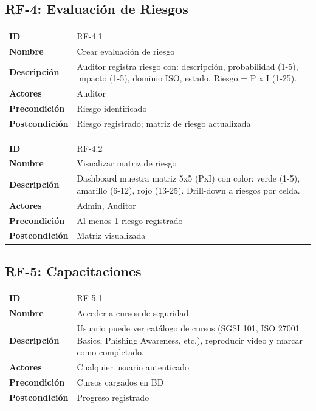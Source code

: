 \documentclass[12pt,a4paper,oneside]{article}
\begin{document}
\subsection{RF-4: Evaluación de Riesgos}

\begin{tabularx}{\linewidth}{|l|X|}
\hline
\textbf{ID} & RF-4.1 \\
\textbf{Nombre} & Crear evaluación de riesgo \\
\textbf{Descripción} & Auditor registra riesgo con: descripción, probabilidad (1-5), impacto (1-5), dominio ISO, estado. Riesgo = P x I (1-25). \\
\textbf{Actores} & Auditor \\
\textbf{Precondición} & Riesgo identificado \\
\textbf{Postcondición} & Riesgo registrado; matriz de riesgo actualizada \\
\hline
\end{tabularx}

\begin{tabularx}{\linewidth}{|l|X|}
\hline
\textbf{ID} & RF-4.2 \\
\textbf{Nombre} & Visualizar matriz de riesgo \\
\textbf{Descripción} & Dashboard muestra matriz 5x5 (PxI) con color: verde (1-5), amarillo (6-12), rojo (13-25). Drill-down a riesgos por celda. \\
\textbf{Actores} & Admin, Auditor \\
\textbf{Precondición} & Al menos 1 riesgo registrado \\
\textbf{Postcondición} & Matriz visualizada \\
\hline
\end{tabularx}

\subsection{RF-5: Capacitaciones}

\begin{tabularx}{\linewidth}{|l|X|}
\hline
\textbf{ID} & RF-5.1 \\
\textbf{Nombre} & Acceder a cursos de seguridad \\
\textbf{Descripción} & Usuario puede ver catálogo de cursos (SGSI 101, ISO 27001 Basics, Phishing Awareness, etc.), reproducir video y marcar como completado. \\
\textbf{Actores} & Cualquier usuario autenticado \\
\textbf{Precondición} & Cursos cargados en BD \\
\textbf{Postcondición} & Progreso registrado \\
\hline
\end{tabularx}
\end{document}
